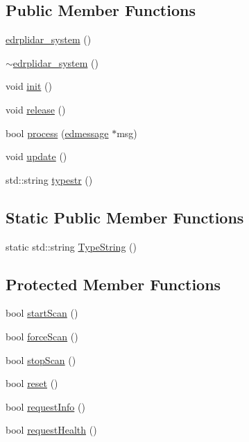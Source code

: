 \subsection*{Public Member Functions}
\begin{DoxyCompactItemize}
\item 
\hyperlink{classedrplidar__system_a3189e92f56cd720a53f0c53c65f3fb53}{edrplidar\-\_\-system} ()
\item 
\hyperlink{classedrplidar__system_aab380eebadbfcd30ae16a4162ce17272}{$\sim$edrplidar\-\_\-system} ()
\item 
void \hyperlink{classedrplidar__system_aeac91046ef78f68cb9463ad216719def}{init} ()
\item 
void \hyperlink{classedrplidar__system_ab8e9f26bd1f1a8501b36d6eaedd44ced}{release} ()
\item 
bool \hyperlink{classedrplidar__system_aa6d1766212432f586944027b0d5b0950}{process} (\hyperlink{structedmessage}{edmessage} $\ast$msg)
\item 
void \hyperlink{classedrplidar__system_aeaa11dbbb634e7392629982a57868c62}{update} ()
\item 
std\-::string \hyperlink{classedrplidar__system_ae777072e4712d7bed997032842f2dad0}{typestr} ()
\end{DoxyCompactItemize}
\subsection*{Static Public Member Functions}
\begin{DoxyCompactItemize}
\item 
static std\-::string \hyperlink{classedrplidar__system_a8aae91a8f5522b8975617ad172c9f663}{Type\-String} ()
\end{DoxyCompactItemize}
\subsection*{Protected Member Functions}
\begin{DoxyCompactItemize}
\item 
bool \hyperlink{classedrplidar__system_a4780aae99366654694ac97e57b94ddbe}{start\-Scan} ()
\item 
bool \hyperlink{classedrplidar__system_aa4b0dcc8db62b695eaaa7f3f076d6958}{force\-Scan} ()
\item 
bool \hyperlink{classedrplidar__system_adb1b55f6f227dc7c1b8ea783be44aab5}{stop\-Scan} ()
\item 
bool \hyperlink{classedrplidar__system_abb48bf173a5590649f069b7340cdb110}{reset} ()
\item 
bool \hyperlink{classedrplidar__system_a35ce6a26a2d1370d7529953cc875cad3}{request\-Info} ()
\item 
bool \hyperlink{classedrplidar__system_aac73b78f69b44c15fdc168a5ed8543ee}{request\-Health} ()
\end{DoxyCompactItemize}


